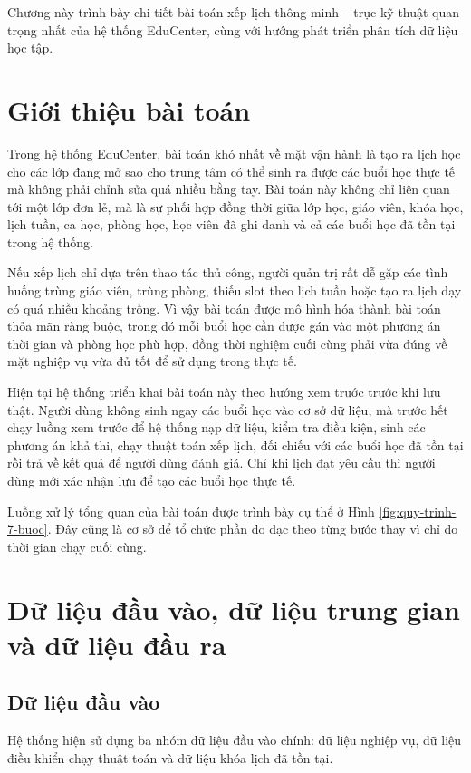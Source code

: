 \documentclass[../DoAn.tex]{subfiles}
\begin{document}
Chương này trình bày chi tiết bài toán xếp lịch thông minh -- trục kỹ thuật quan trọng nhất của hệ thống EduCenter, cùng với hướng phát triển phân tích dữ liệu học tập.

\section{Giới thiệu bài toán}
\label{section:5.1}
Trong hệ thống EduCenter, bài toán khó nhất về mặt vận hành là tạo ra lịch học cho các lớp đang mở sao cho trung tâm có thể sinh ra được các buổi học thực tế mà không phải chỉnh sửa quá nhiều bằng tay. Bài toán này không chỉ liên quan tới một lớp đơn lẻ, mà là sự phối hợp đồng thời giữa lớp học, giáo viên, khóa học, lịch tuần, ca học, phòng học, học viên đã ghi danh và cả các buổi học đã tồn tại trong hệ thống.

Nếu xếp lịch chỉ dựa trên thao tác thủ công, người quản trị rất dễ gặp các tình huống trùng giáo viên, trùng phòng, thiếu slot theo lịch tuần hoặc tạo ra lịch dạy có quá nhiều khoảng trống. Vì vậy bài toán được mô hình hóa thành bài toán thỏa mãn ràng buộc, trong đó mỗi buổi học cần được gán vào một phương án thời gian và phòng học phù hợp, đồng thời nghiệm cuối cùng phải vừa đúng về mặt nghiệp vụ vừa đủ tốt để sử dụng trong thực tế.

Hiện tại hệ thống triển khai bài toán này theo hướng xem trước trước khi lưu thật. Người dùng không sinh ngay các buổi học vào cơ sở dữ liệu, mà trước hết chạy luồng xem trước để hệ thống nạp dữ liệu, kiểm tra điều kiện, sinh các phương án khả thi, chạy thuật toán xếp lịch, đối chiếu với các buổi học đã tồn tại rồi trả về kết quả để người dùng đánh giá. Chỉ khi lịch đạt yêu cầu thì người dùng mới xác nhận lưu để tạo các buổi học thực tế.

\noindent
Luồng xử lý tổng quan của bài toán được trình bày cụ thể ở Hình \ref{fig:quy-trinh-7-buoc}. Đây cũng là cơ sở để tổ chức phần đo đạc theo từng bước thay vì chỉ đo thời gian chạy cuối cùng.

\section{Dữ liệu đầu vào, dữ liệu trung gian và dữ liệu đầu ra}
\label{section:5.2}

\subsection{Dữ liệu đầu vào}
Hệ thống hiện sử dụng ba nhóm dữ liệu đầu vào chính: dữ liệu nghiệp vụ, dữ liệu điều khiển chạy thuật toán và dữ liệu khóa lịch đã tồn tại.
\end{document}
